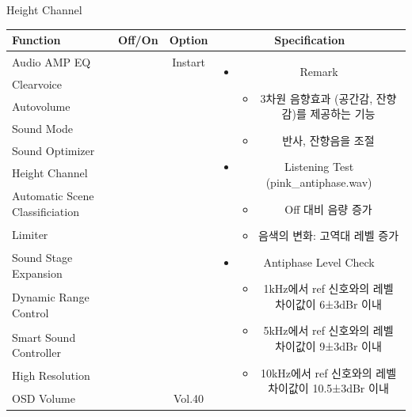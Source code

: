 \documentclass{beamer}
\begin{document}
\begin{frame}[t]{Height Channel}
\begin{tiny}
\begin{tabular}{@{}lccc@{}}
\toprule
Function & Off/On & Option & Specification \\
\midrule
Audio AMP EQ & \color{black}{Off} & Instart &
\multirow{13}{60mm}{
\begin{itemize}
\item Remark
	\begin{itemize}
	\item 3차원 음향효과 (공간감, 잔향감)를 제공하는 기능
	\item 반사, 잔향음을 조절
	\end{itemize}
\item Listening Test (pink\_antiphase.wav)
	\begin{itemize}
	\item Off 대비 음량 증가
	\item 음색의 변화: 고역대 레벨 증가
	\end{itemize}
\item Antiphase Level Check
  \begin{itemize}
  \item 1kHz에서 ref 신호와의 레벨 차이값이 6±3dBr 이내
  \item 5kHz에서 ref 신호와의 레벨 차이값이 9±3dBr 이내
  \item 10kHz에서 ref 신호와의 레벨 차이값이 10.5±3dBr 이내
  \end{itemize}
\end{itemize}
} \\
Clearvoice & \color{black}{Off} & & \\
Autovolume & \color{black}{Off} & & \\
Sound Mode & \color{black}{Off} & & \\
Sound Optimizer & \color{black}{Off} & & \\
Height Channel & \color{blue}{On} & & \\
Automatic Scene Classificiation & \color{black}{Off} & & \\
Limiter & \color{black}{Off} & & \\
Sound Stage Expansion & \color{black}{Off} & & \\
Dynamic Range Control & \color{black}{Off} & & \\
Smart Sound Controller & \color{black}{Off} & & \\
High Resolution & \color{black}{Off} & & \\
OSD Volume & \color{blue}{On} & Vol.40 & \\
\midrule
\end{tabular}
\end{tiny}

\end{frame}
\end{document}
